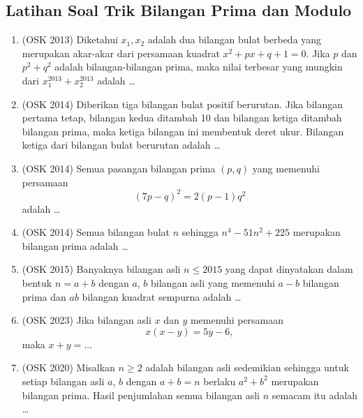 \subsection{Latihan Soal Trik Bilangan Prima dan Modulo}
\begin{enumerate}
        \item (OSK 2013) Diketahui $x_1,x_2$ adalah dua bilangan bulat berbeda yang merupakan akar-akar dari persamaan kuadrat $x^2+px+q+1=0$. Jika $p$ dan $p^2+q^2$ adalah bilangan-bilangan prima, maka nilai terbesar yang mungkin dari $x_1^{2013}+x_2^{2013}$ adalah \dots
        
        \item (OSK 2014) Diberikan tiga bilangan bulat positif berurutan. Jika bilangan pertama tetap, bilangan kedua ditambah 10 dan bilangan ketiga ditambah bilangan prima, maka ketiga bilangan ini membentuk deret ukur. Bilangan ketiga dari bilangan bulat berurutan adalah \dots
        
        \item (OSK 2014) Semua pasangan bilangan prima $(p,q)$ yang memenuhi persamaan
        $$(7p-q)^2=2(p-1)q^2$$
        adalah \dots
        
        \item (OSK 2014) Semua bilangan bulat $n$ sehingga $n^4-51n^2+225$ merupakan bilangan prima adalah \dots

        \item (OSK 2015) Banyaknya bilangan asli $n \leq 2015$ yang dapat dinyatakan dalam bentuk $n = a + b$ dengan $a$, $b$ bilangan asli yang memenuhi $a - b$ bilangan prima dan $ab$ bilangan kuadrat sempurna adalah \ldots

        
        \item (OSK 2023) Jika bilangan asli $x$ dan $y$ memenuhi persamaan
        $$x(x-y)=5y-6,$$
        maka $x+y=\ldots$

        \item (OSK 2020) Misalkan $n \geq 2$ adalah bilangan asli sedemikian sehingga untuk setiap bilangan asli $a$, $b$ dengan $a + b = n$ berlaku $a^2 + b^2$ merupakan bilangan prima. Hasil penjumlahan semua bilangan asli $n$ semacam itu adalah \ldots
\end{enumerate}